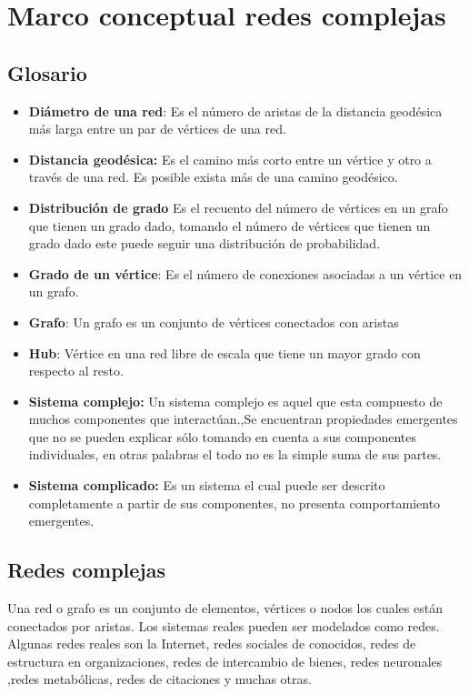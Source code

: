 \section{Marco conceptual redes complejas}

\subsection{Glosario}
\begin{itemize}
    \item \textbf{Diámetro de una red}: Es el número de aristas de la distancia geodésica más larga
    entre un par de vértices de una red.
    \item \textbf{Distancia geodésica:} Es el camino más corto entre un vértice y otro a través de una red. Es posible exista más de una camino geodésico.
    \item \textbf{Distribución de grado} Es el recuento del número de vértices en un grafo que tienen un grado dado, tomando el número de vértices que tienen un grado dado este puede seguir una distribución de probabilidad.
    \item \textbf{Grado de un vértice}: Es el número de conexiones asociadas a un vértice en un grafo.
    \item \textbf{Grafo}: Un grafo es un conjunto de vértices conectados con aristas
    \item \textbf{Hub}: Vértice en una red libre de escala que tiene un mayor grado con respecto al resto.
    \item \textbf{Sistema complejo:} Un sistema complejo es aquel que esta compuesto de muchos componentes que interactúan.,Se encuentran propiedades emergentes que no se pueden explicar sólo tomando en cuenta a sus componentes individuales, en otras palabras el todo no es la simple suma de sus partes.
    \item \textbf{Sistema complicado:} Es un sistema el cual puede ser descrito completamente a partir de sus componentes, no presenta comportamiento emergentes.
\end{itemize}


\subsection{Redes complejas}

Una red o grafo\cite{Newman2003}
es un conjunto de elementos, vértices o nodos los cuales están conectados por aristas. Los sistemas reales pueden ser modelados como redes. Algunas redes reales son la Internet, redes sociales de conocidos, redes de estructura en organizaciones, redes de intercambio de bienes, redes neuronales ,redes metabólicas, redes de citaciones y muchas otras.

